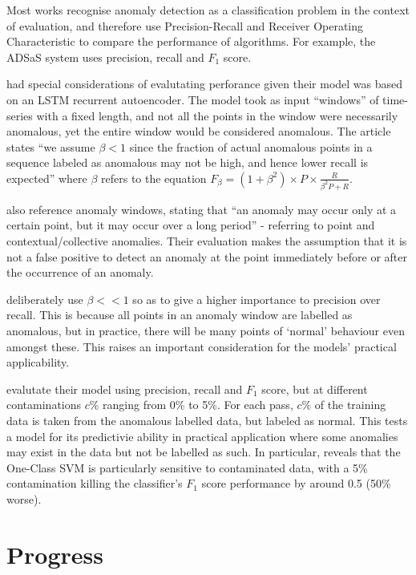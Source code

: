 \documentclass{mproj}
\begin{document}
Most works recognise anomaly detection as a classification problem in the context of evaluation, and therefore use Precision-Recall and Receiver Operating Characteristic \citep{outlierAnalysisBook} to compare the performance of algorithms. For example, the ADSaS system \citep{ADSaS} uses precision, recall and $F_1$ score.

\cite{lstmEncoderDecorder} had special considerations of evalutating perforance given their model was based on an LSTM recurrent autoencoder. The model took as input ``windows'' of time-series with a fixed length, and not all the points in the window were necessarily anomalous, yet the entire window would be considered anomalous. The article states ``we assume $\beta < 1$ since the fraction of actual anomalous points in a sequence labeled as anomalous may not be high, and hence lower recall is expected'' where $\beta$ refers to the equation $F_{\beta} = (1 + \beta^2) \times P \times \frac{R}{\beta^2 P + R}$.

\cite{ADSaS} also reference anomaly windows, stating that ``an anomaly may occur only at a certain point, but it may occur over a long period'' - referring to point and contextual/collective anomalies. Their evaluation makes the assumption that it is not a false positive to detect an anomaly at the point immediately before or after the occurrence of an anomaly.

\cite{lstmTimeSeriesAnomalyDetection} deliberately use $\beta<<1$ so as to give a higher importance to precision over recall. This is because all points in an anomaly window are labelled as anomalous, but in practice, there will be many points of ‘normal’ behaviour even amongst these. This raises an important consideration for the models' practical applicability.

\cite{DAGMM} evalutate their model using precision, recall and $F_1$ score, but at different contaminations $c\%$ ranging from 0\% to 5\%. For each pass, $c\%$ of the training data is taken from the anomalous labelled data, but labeled as normal. This tests a model for its predictivie ability in practical application where some anomalies may exist in the data but not be labelled as such. In particular, \cite{DAGMM} reveals that the One-Class SVM is particularly sensitive to contaminated data, with a 5\% contamination killing the classifier's $F_1$ score performance by around 0.5 (50\% worse).

\section{Progress}
\end{document}
